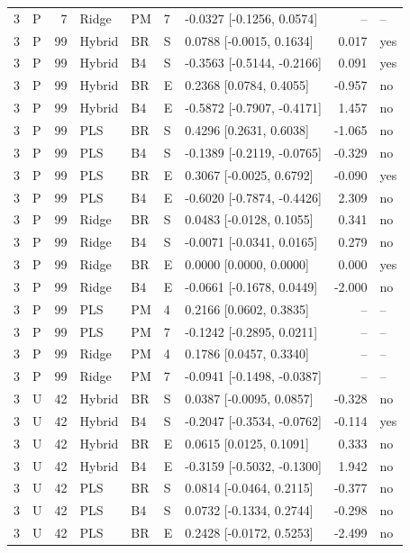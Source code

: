 \documentclass[10pt,a4paper]{article}
\begin{document}
\begin{landscape}
\begin{longtable}{rlrllllrl}
3 & P & 7 & Ridge & PM & 7 & -0.0327 [-0.1256, 0.0574] & -- & -- \\
3 & P & 99 & Hybrid & BR & S & 0.0788 [-0.0015, 0.1634] & 0.017 & yes \\
3 & P & 99 & Hybrid & B4 & S & -0.3563 [-0.5144, -0.2166] & 0.091 & yes \\
3 & P & 99 & Hybrid & BR & E & 0.2368 [0.0784, 0.4055] & -0.957 & no \\
3 & P & 99 & Hybrid & B4 & E & -0.5872 [-0.7907, -0.4171] & 1.457 & no \\
3 & P & 99 & PLS & BR & S & 0.4296 [0.2631, 0.6038] & -1.065 & no \\
3 & P & 99 & PLS & B4 & S & -0.1389 [-0.2119, -0.0765] & -0.329 & no \\
3 & P & 99 & PLS & BR & E & 0.3067 [-0.0025, 0.6792] & -0.090 & yes \\
3 & P & 99 & PLS & B4 & E & -0.6020 [-0.7874, -0.4426] & 2.309 & no \\
3 & P & 99 & Ridge & BR & S & 0.0483 [-0.0128, 0.1055] & 0.341 & no \\
3 & P & 99 & Ridge & B4 & S & -0.0071 [-0.0341, 0.0165] & 0.279 & no \\
3 & P & 99 & Ridge & BR & E & 0.0000 [0.0000, 0.0000] & 0.000 & yes \\
3 & P & 99 & Ridge & B4 & E & -0.0661 [-0.1678, 0.0449] & -2.000 & no \\
3 & P & 99 & PLS & PM & 4 & 0.2166 [0.0602, 0.3835] & -- & -- \\
3 & P & 99 & PLS & PM & 7 & -0.1242 [-0.2895, 0.0211] & -- & -- \\
3 & P & 99 & Ridge & PM & 4 & 0.1786 [0.0457, 0.3340] & -- & -- \\
3 & P & 99 & Ridge & PM & 7 & -0.0941 [-0.1498, -0.0387] & -- & -- \\
3 & U & 42 & Hybrid & BR & S & 0.0387 [-0.0095, 0.0857] & -0.328 & no \\
3 & U & 42 & Hybrid & B4 & S & -0.2047 [-0.3534, -0.0762] & -0.114 & yes \\
3 & U & 42 & Hybrid & BR & E & 0.0615 [0.0125, 0.1091] & 0.333 & no \\
3 & U & 42 & Hybrid & B4 & E & -0.3159 [-0.5032, -0.1300] & 1.942 & no \\
3 & U & 42 & PLS & BR & S & 0.0814 [-0.0464, 0.2115] & -0.377 & no \\
3 & U & 42 & PLS & B4 & S & 0.0732 [-0.1334, 0.2744] & -0.298 & no \\
3 & U & 42 & PLS & BR & E & 0.2428 [-0.0172, 0.5253] & -2.499 & no \\

\end{longtable}
\end{landscape}
\end{document}
